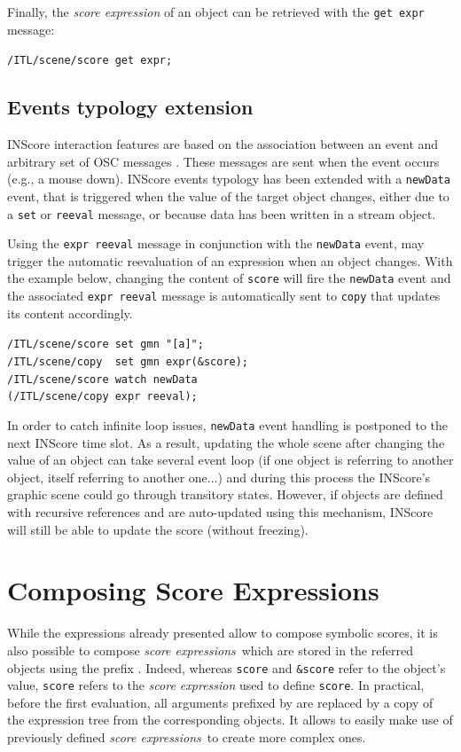 \documentclass{article}
\newcommand{\OSC}[1]{{\fontsize{10pt}{10pt} \selectfont\texttt{#1}}}
\newcommand{\param}[1]{\textcolor{figOrange}{#1}}
\newcommand{\prefix}[1]{\textcolor{figBlue}{#1}}
\newcommand{\sExpr}{\emph{score expressions}}
\newcommand{\lowTilde}{\texttildelow}
\newcommand{\sample}	[1]			{\vspace{-0.2em}\begin{center}\colorbox{mygrey}{\begin{minipage}[t]{0.95\columnwidth} {\small \texttt{#1}}\end{minipage}}\end{center}}
\begin{document}
Finally, the  \emph{score expression} of an object can be retrieved with the \OSC{get expr} message:
\sample{/ITL/scene/score get expr;}

\subsection{Events typology extension}
\label{exprEvents}

INScore interaction features are based on the association between an event and arbitrary set of OSC messages \cite{Fober:13b}. These messages are sent when the event occurs (e.g., a mouse down).
INScore events typology has been extended with a \OSC{newData} event, that is triggered when the value of the target object changes, either due to a \OSC{set} or \OSC{reeval} message, or because data has been written in a stream object.

Using the \OSC{expr reeval} message in conjunction with the \OSC{newData} event, may trigger the automatic reevaluation of an expression when an object changes. With the example below, changing the content of \OSC{score} will fire the \OSC{newData} event and the associated \OSC{expr reeval} message is automatically sent to \OSC{copy} that updates its content accordingly.
\sample{/ITL/scene/score set gmn "[a]";\\
/ITL/scene/copy\ \ set gmn expr(\&score);\\
/ITL/scene/score watch newData\\   
\hspace*{8mm}(/ITL/scene/copy expr reeval);
}

In order to catch infinite loop issues, \OSC{newData} event handling is postponed to the next INScore time slot. As a result, updating the whole scene after changing the value of an object can take several event loop (if one object is referring to another object, itself referring to another one...) and during this process the INScore's graphic scene could go through transitory states. However, if objects are defined with recursive references and are auto-updated using this mechanism, INScore will still be able to update the score (without freezing).

\section{Composing Score Expressions}
\label{composingExpr}
While the expressions already presented allow to compose symbolic scores, it is also possible to compose \sExpr\ which are stored in the referred objects using the prefix \OSC{\prefix{\lowTilde}}. Indeed, whereas \OSC{\param{score}} and \OSC{\prefix{\&}\param{score}} refer to the object's value, \OSC{\prefix{\lowTilde}\param{score}} refers to the \emph{score expression} used to define \OSC{score}. In practical, before the first evaluation, all arguments prefixed by \OSC{\prefix{\lowTilde}} are replaced by a copy of the expression tree from the corresponding objects.
It allows to easily make use of previously defined \sExpr\ to create more complex ones. 
\end{document}
